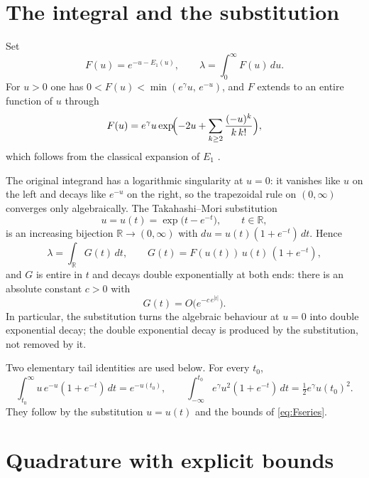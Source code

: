 \documentclass[11pt,a4paper]{article}
\theoremstyle{remark}
\newcommand{\Eone}{E_1}
\newcommand{\lam}{\lambda}
\newcommand{\R}{\mathbb{R}}
\begin{document}
\section{The integral and the substitution}

Set
\begin{equation}
  F(u)=e^{-u-\Eone(u)},\qquad \lam=\int_0^\infty F(u)\,du .
\end{equation}
For $u>0$ one has $0<F(u)<\min(e^\gamma u,\,e^{-u})$, and $F$ extends to
an entire function of $u$ through
\begin{equation}
  F(u)=e^{\gamma}u\exp\!\Bigl(-2u+\sum_{k\ge2}\frac{(-u)^k}{k\,k!}\Bigr),
  \label{eq:Fseries}
\end{equation}
which follows from the classical expansion of $\Eone$
\cite[5.1.11]{AS1964}.

The original integrand has a logarithmic singularity at $u=0$: it
vanishes like $u$ on the left and decays like $e^{-u}$ on the right, so
the trapezoidal rule on $(0,\infty)$ converges only algebraically. The
Takahashi--Mori substitution
\begin{equation}
  u=u(t)=\exp\bigl(t-e^{-t}\bigr),\qquad t\in\R,
  \label{eq:subst}
\end{equation}
is an increasing bijection $\R\to(0,\infty)$ with
$du=u(t)(1+e^{-t})\,dt$. Hence
\begin{equation}
  \lam=\int_{\R}G(t)\,dt,\qquad
  G(t)=F(u(t))\,u(t)\,(1+e^{-t}),
  \label{eq:G}
\end{equation}
and $G$ is entire in $t$ and decays double exponentially at both ends:
there is an absolute constant $c>0$ with
\begin{equation}
  G(t)=O\bigl(e^{-c\,e^{|t|}}\bigr).
  \label{eq:decay}
\end{equation}
In particular, the substitution turns the algebraic behaviour at $u=0$
into double exponential decay; the double exponential decay is produced
by the substitution, not removed by it.

Two elementary tail identities are used below. For every $t_0$,
\begin{equation}
  \int_{t_0}^{\infty}u\,e^{-u}(1+e^{-t})\,dt=e^{-u(t_0)},\qquad
  \int_{-\infty}^{t_0}e^{\gamma}u^2(1+e^{-t})\,dt
  =\tfrac12 e^{\gamma}u(t_0)^2 .
  \label{eq:tails}
\end{equation}
They follow by the substitution $u=u(t)$ and the bounds of
\eqref{eq:Fseries}.

\section{Quadrature with explicit bounds}
\end{document}
